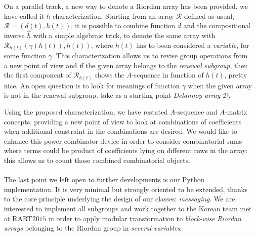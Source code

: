 On a parallel track, a new way to denote a Riordan array has been provided, we
have called it $h$-characterization. Starting from an array $\mathcal{R}$
defined as usual, $\mathcal{R}=(d(t),h(t))$, it is possible to combine function $d$
and the compositional inverse $\hat{h}$ with a simple algebraic trick, to denote
the same array with $\mathcal{R}_{h(t)}(\gamma(h(t)),h(t))$, where $h(t)$ has
to been considered a \emph{variable}, for some function $\gamma$. This characterization
allows us to revise group operations from a new point of view and if the given array
belongs to the \emph{renewal subgroup}, then the first component of $\mathcal{R}_{h(t)}$
shows the $A$-sequence in function of $h(t)$, pretty nice. An open question is to look for 
meanings of function $\gamma$ when the given array is not in the renewal subgroup, take 
as a starting point \emph{Delannoy array} $\mathcal{D}$.

Using the proposed characterization, we have restated $A$-sequence and
$A$-matrix concepts, providing a new point of view to look at combinations of
coefficients when additional constraint in the combinations are desired. We
would like to enhance this power combinator device in order to consider
combinatorial sums where terms could be product of coefficients lying on
different rows in the array: this allows us to count those combined combinatorial
objects.
\\\\
The last point we left open to further developments is our Python implementation.
It is very minimal but strongly oriented to be extended, thanks to the core principle
underlying the design of our classes: \emph{messaging}. We are interested to implement
all subgroups and work together to the Korean team met at RART$2015$ in order to 
apply modular transformation to \emph{block-wise} \emph{Riordan arrays} belonging to 
the Riordan group in \emph{several variables}. 

